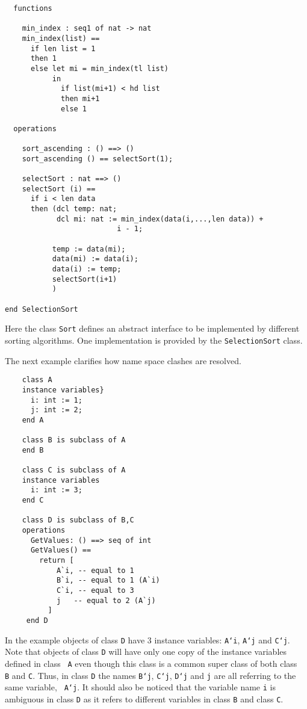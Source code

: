 \documentclass{overturerepchap}
\begin{document}
{\begin{description}
\begin{lstlisting}
  functions

    min_index : seq1 of nat -> nat
    min_index(list) ==
      if len list = 1
      then 1
      else let mi = min_index(tl list)
           in
             if list(mi+1) < hd list
             then mi+1
             else 1

  operations

    sort_ascending : () ==> ()
    sort_ascending () == selectSort(1);

    selectSort : nat ==> ()
    selectSort (i) ==
      if i < len data
      then (dcl temp: nat;
            dcl mi: nat := min_index(data(i,...,len data)) +
                          i - 1;

           temp := data(mi);
           data(mi) := data(i);
           data(i) := temp;
           selectSort(i+1)
           )

end SelectionSort
\end{lstlisting}
Here the class \texttt{Sort} defines an abstract interface to be
implemented by different sorting algorithms. One implementation is
provided by the \texttt{SelectionSort} class.

The next example clarifies how name space clashes are resolved.
  \begin{lstlisting}
    class A
    instance variables}
      i: int := 1;
      j: int := 2;
    end A

    class B is subclass of A
    end B

    class C is subclass of A
    instance variables
      i: int := 3;
    end C

    class D is subclass of B,C
    operations
      GetValues: () ==> seq of int
      GetValues() ==
        return [
            A`i, -- equal to 1
            B`i, -- equal to 1 (A`i)
            C`i, -- equal to 3
            j   -- equal to 2 (A`j)
          ]
     end D
  \end{lstlisting}
\end{description}

In the example objects of class {\tt D} have 3 instance variables:
{\tt A`i}, {\tt A`j} and {\tt C`j}. Note that objects of class {\tt D}
will have only one copy of the instance variables defined in class {\tt
A} even though this class is a common super class of both class {\tt
B} and {\tt C}. Thus, in class {\tt D} the names {\tt B`j}, {\tt C`j},
{\tt D`j} and {\tt j} are all referring to the same variable, {\tt
A`j}. It should also be noticed that the variable name {\tt i} is
ambiguous in class {\tt D} as it refers to different variables in
class {\tt B} and class {\tt C}.

}
\end{document}
